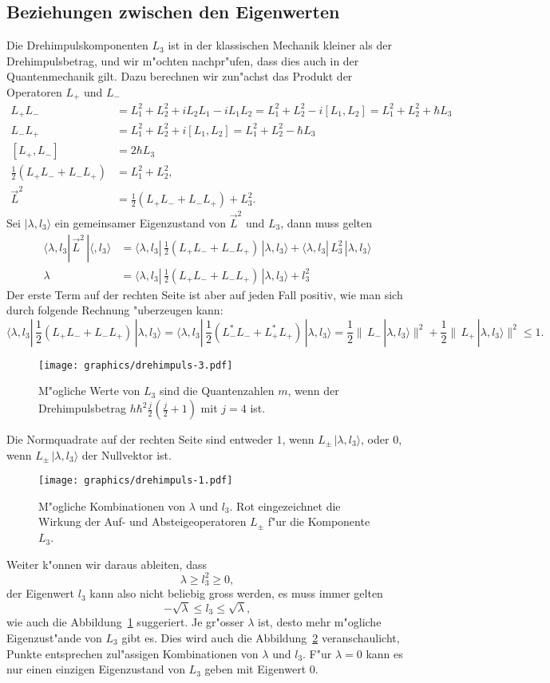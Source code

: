 \subsection{Beziehungen zwischen den Eigenwerten}
Die Drehimpulskomponenten $L_3$ ist in der klassischen Mechanik kleiner
als der Drehimpulsbetrag, und wir m"ochten nachpr"ufen, dass dies auch
in der Quantenmechanik gilt.
Dazu berechnen wir zun"achst das Produkt der Operatoren $L_+$ und $L_-$
\begin{align*}
L_+L_-
&=
L_1^2+L_2^2 +iL_2L_1-iL_1L_2=L_1^2+L_2^2 -i[L_1,L_2]=L_1^2+L_2^2+\hbar L_3
\\
L_-L_+
&=
L_1^2  + L_2^2 +i[L_1,L_2]=L_1^2+L_2^2-\hbar L_3
\\
[L_+,L_-]
&=
2\hbar L_3
\\
{\textstyle \frac12}(L_+L_-+L_-L_+)&=L_1^2+L_2^2,
\\
\vec L^2
&=
{\textstyle\frac12}(L_+L_-+L_-L_+)+L_3^2.
\end{align*}
Sei $|\lambda,l_3\rangle$ ein gemeinsamer Eigenzustand von $\vec L^2$
und $L_3$, dann muss gelten
\begin{align*}
\langle \lambda,l_3|\,\vec L^2\,|\langle, l_3\rangle
&=
\langle \lambda,l_3|
\,
{\textstyle\frac12}(L_+L_-+L_-L_+)
\,
|\lambda,l_3\rangle
+
\langle \lambda,l_3|
\,
L_3^2
\,
|\lambda,l_3\rangle
\\
\lambda
&=
\langle \lambda,l_3|
\,
{\textstyle\frac12}(L_+L_-+L_-L_+)
\,
|\lambda,l_3\rangle
+
l_3^2
\end{align*}
Der erste Term auf der rechten Seite ist aber auf jeden Fall positiv,
wie man sich durch folgende Rechnung "uberzeugen kann:
\[
\langle \lambda,l_3|
\,
{\textstyle\frac12}(L_+L_-+L_-L_+)
\,
|\lambda,l_3\rangle
=
\langle \lambda,l_3|
\,
{\textstyle\frac12}(L_-^*L_-+L_+^*L_+)
\,
|\lambda,l_3\rangle
=
\frac12\|\,L_-\,|\lambda,l_3\rangle\|^2
+
\frac12\|\,L_+\,|\lambda,l_3\rangle\|^2
\le 1.
\]
\begin{figure}
\centering
\texttt{[image: graphics/drehimpuls-3.pdf]}
\caption{M"ogliche Werte von $L_3$ sind die Quantenzahlen $m$, wenn
der Drehimpulsbetrag $h\hbar^2 \frac{j}2(\frac{j}2+1)$ mit $j=4$ ist.
\label{drehimpulsrange}}
\end{figure}
Die Normquadrate auf der rechten Seite sind entweder $1$,
wenn $L_\pm\,|\lambda,l_3\rangle$, oder 0, wenn $L_\pm\,|\lambda,l_3\rangle$
der Nullvektor ist.
\begin{figure}
\centering
\texttt{[image: graphics/drehimpuls-1.pdf]}
\caption{M"ogliche Kombinationen von $\lambda$ und $l_3$. Rot eingezeichnet
die Wirkung der Auf- und Absteigeoperatoren $L_\pm$ f"ur die Komponente $L_3$.
\label{drehimpulsspektrum}}
\end{figure}
Weiter k"onnen wir daraus ableiten, dass 
\[
\lambda\ge l_3^2\ge 0,
\]
der Eigenwert $l_3$ kann also nicht beliebig gross werden, es muss immer
gelten
\[
-\sqrt{\lambda}\le l_3\le \sqrt{\lambda},
\]
wie auch die Abbildung~\ref{drehimpulsrange} suggeriert.
Je gr"osser $\lambda$ ist, desto mehr m"ogliche Eigenzust"ande von $L_3$
gibt es.
Dies wird auch die Abbildung~\ref{drehimpulsspektrum} veranschaulicht,
Punkte entsprechen zul"assigen Kombinationen von $\lambda$ und $l_3$.
F"ur $\lambda=0$ kann es nur einen einzigen Eigenzustand von $L_3$ geben
mit Eigenwert $0$.

